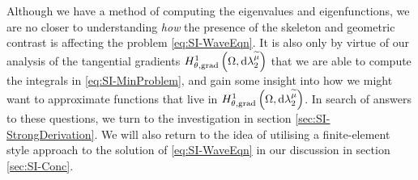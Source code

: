 Although we have a method of computing the eigenvalues and eigenfunctions, we are no closer to understanding \emph{how} the presence of the skeleton and geometric contrast is affecting the problem \eqref{eq:SI-WaveEqn}.
It is also only by virtue of our analysis of the tangential gradients $H^1_{\theta, \mathrm{grad}}\left( \Omega, \mathrm{d}\lambda_2^{\widetilde{\mu}} \right)$ that we are able to compute the integrals in \eqref{eq:SI-MinProblem}, and gain some insight into how we might want to approximate functions that live in $H^1_{\theta, \mathrm{grad}}\left( \Omega, \mathrm{d}\lambda_2^{\widetilde{\mu}} \right)$.
In search of answers to these questions, we turn to the investigation in section \ref{sec:SI-StrongDerivation}.
We will also return to the idea of utilising a finite-element style approach to the solution of \eqref{eq:SI-WaveEqn} in our discussion in section \ref{sec:SI-Conc}.